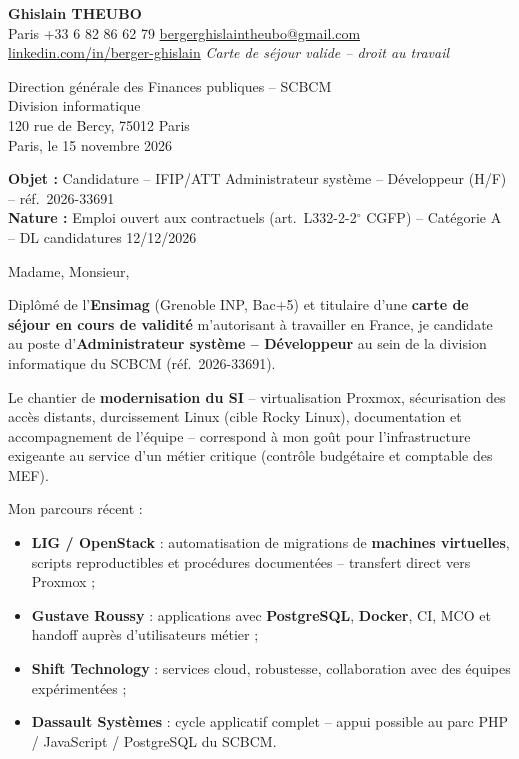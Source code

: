 \documentclass[11pt,a4paper]{article}
\begin{document}

\noindent\textbf{Ghislain THEUBO}\\
Paris \quad +33 6 82 86 62 79 \quad \href{mailto:bergerghislaintheubo@gmail.com}{bergerghislaintheubo@gmail.com}\\
\href{https://www.linkedin.com/in/berger-ghislain}{linkedin.com/in/berger-ghislain} \quad \textit{Carte de s\'ejour valide -- droit au travail}

\vspace{0.5em}
\begin{flushright}
Direction g\'en\'erale des Finances publiques -- SCBCM\\
Division informatique\\
120 rue de Bercy, 75012 Paris\\
Paris, le 15 novembre 2026
\end{flushright}

\vspace{0.35em}
\noindent\textbf{Objet :} Candidature -- IFIP/ATT Administrateur syst\`eme -- D\'eveloppeur (H/F) -- r\'ef.\ 2026-33691\\
\noindent\textbf{Nature :} Emploi ouvert aux contractuels (art.\ L332-2-2$^\circ$ CGFP) -- Cat\'egorie A -- DL candidatures 12/12/2026

\vspace{0.7em}
\noindent Madame, Monsieur,

\vspace{0.4em}
\noindent Dipl\^om\'e de l'\textbf{Ensimag} (Grenoble INP, Bac+5) et titulaire d'une \textbf{carte de s\'ejour en cours de validit\'e} m'autorisant \`a travailler en France, je candidate au poste d'\textbf{Administrateur syst\`eme -- D\'eveloppeur} au sein de la division informatique du SCBCM (r\'ef.\ 2026-33691).

\vspace{0.35em}
\noindent Le chantier de \textbf{modernisation du SI} -- virtualisation Proxmox, s\'ecurisation des acc\`es distants, durcissement Linux (cible Rocky Linux), documentation et accompagnement de l'\'equipe -- correspond \`a mon go\^ut pour l'infrastructure exigeante au service d'un m\'etier critique (contr\^ole budg\'etaire et comptable des MEF).

\vspace{0.3em}
\noindent Mon parcours r\'ecent :
\begin{itemize}\itemsep0.15em
  \item \textbf{LIG / OpenStack} : automatisation de migrations de \textbf{machines virtuelles}, scripts reproductibles et proc\'edures document\'ees -- transfert direct vers Proxmox ;
  \item \textbf{Gustave Roussy} : applications avec \textbf{PostgreSQL}, \textbf{Docker}, CI, MCO et handoff aupr\`es d'utilisateurs m\'etier ;
  \item \textbf{Shift Technology} : services cloud, robustesse, collaboration avec des \'equipes exp\'eriment\'ees ;
  \item \textbf{Dassault Syst\`emes} : cycle applicatif complet -- appui possible au parc PHP / JavaScript / PostgreSQL du SCBCM.
\end{itemize}
\end{document}

